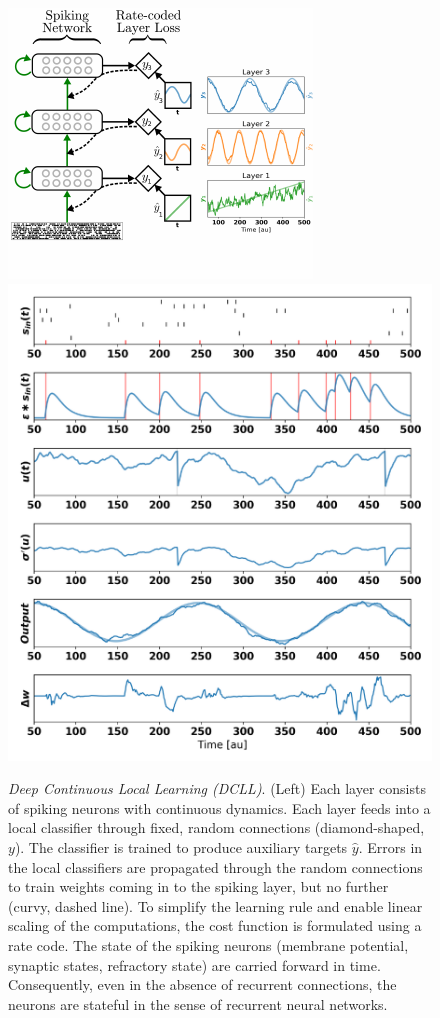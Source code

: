 \documentclass[english]{article}
\begin{document}
\begin{figure}
\begin{center}
  \includegraphics[height=.32\textheight]{img/synthetic_illustration}
  \hspace{.05\textwidth}
  \includegraphics[height=.32\textheight]{img/snapshot}
\end{center}
  \caption{\label{fig:dcll_illustration}\emph{Deep Continuous Local Learning (DCLL)}. (Left) Each layer consists of spiking neurons with continuous dynamics. Each layer feeds into a local classifier through fixed, random connections (diamond-shaped, $y$). The classifier is trained to produce auxiliary targets $\hat{y}$. Errors in the local classifiers are propagated through the random connections to train weights coming in to the spiking layer, but no further (curvy, dashed line). To simplify the learning rule and enable linear scaling of the computations, the cost function is formulated using a rate code. The state of the spiking neurons (membrane potential, synaptic states, refractory state) are carried forward in time. Consequently, even in the absence of recurrent connections, the neurons are stateful in the sense of recurrent neural networks.
}
\end{figure}
\end{document}

